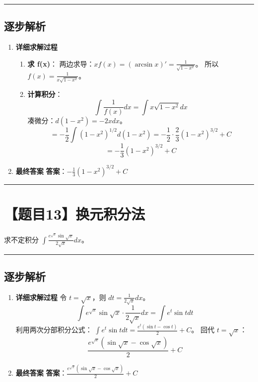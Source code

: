 \documentclass[UTF8]{ctexart}
\newenvironment{redenv}{\color{red}}{}
\newenvironment{detailedanalysis}{%
    \color{red}
    \begin{enumerate}[label=\textbf{第\arabic*步：}, leftmargin=*, align=left, itemsep=1.5ex]
}{%
    \end{enumerate}
}
\newcommand{\problemrule}{\noindent\rule{\textwidth}{1.5pt}\vspace{-0.8em}}
\newcommand{\analysisrule}{\noindent\rule{\textwidth}{0.8pt}\vspace{-0.8em}}
\begin{document}
\begin{redenv}
\analysisrule
\subsection*{逐步解析}

\begin{detailedanalysis}
\item \textbf{详细求解过程}
\begin{enumerate}[label=(\arabic*)]
\item \textbf{求 f(x)}：
两边求导：$xf(x) = (\arcsin x)' = \frac{1}{\sqrt{1-x^2}}$。
所以 $f(x) = \frac{1}{x\sqrt{1-x^2}}$。
\item \textbf{计算积分}：
$$ \int \frac{1}{f(x)} dx = \int x\sqrt{1-x^2} dx $$
凑微分：$d(1-x^2) = -2x dx$。
$$ = -\frac{1}{2} \int (1-x^2)^{1/2} d(1-x^2) = -\frac{1}{2} \cdot \frac{2}{3} (1-x^2)^{3/2} + C $$
$$ = -\frac{1}{3} (1-x^2)^{3/2} + C $$
\end{enumerate}

\item \textbf{最终答案}
\textbf{答案}：$ -\frac{1}{3} (1-x^2)^{3/2} + C $
\end{detailedanalysis}
\end{redenv}

\problemrule
\section*{【题目13】换元积分法}
求不定积分 $ \int\frac{e^{\sqrt{x}}\sin\sqrt{x}}{2\sqrt{x}}dx $。

\begin{redenv}
\analysisrule
\subsection*{逐步解析}

\begin{detailedanalysis}
\item \textbf{详细求解过程}
令 $t = \sqrt{x}$，则 $dt = \frac{1}{2\sqrt{x}} dx$。
$$ \int e^{\sqrt{x}}\sin\sqrt{x} \cdot \frac{1}{2\sqrt{x}} dx = \int e^t \sin t dt $$
利用两次分部积分公式：
$\int e^t \sin t dt = \frac{e^t(\sin t - \cos t)}{2} + C$。
回代 $t = \sqrt{x}$：
$$ \frac{e^{\sqrt{x}}(\sin\sqrt{x} - \cos\sqrt{x})}{2} + C $$

\item \textbf{最终答案}
\textbf{答案}：$ \frac{e^{\sqrt{x}}(\sin\sqrt{x} - \cos\sqrt{x})}{2} + C $
\end{detailedanalysis}
\end{redenv}
\end{document}
